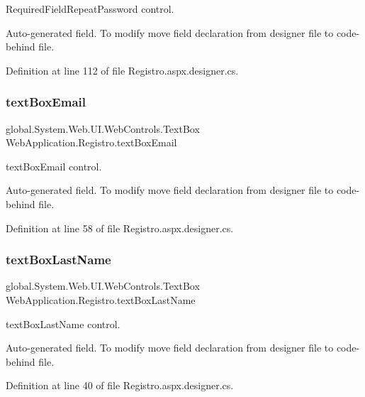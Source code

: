 Required\+Field\+Repeat\+Password control. 

Auto-\/generated field. To modify move field declaration from designer file to code-\/behind file. 

Definition at line 112 of file Registro.\+aspx.\+designer.\+cs.

\mbox{\label{classWebApplication_1_1Registro_a59faaf483b15d3083f8af6d61ff8c41e}} 
\subsubsection{\texorpdfstring{textBoxEmail}{textBoxEmail}}
{\footnotesize\ttfamily global.\+System.\+Web.\+U\+I.\+Web\+Controls.\+Text\+Box Web\+Application.\+Registro.\+text\+Box\+Email\hspace{0.3cm}{\ttfamily [protected]}}



text\+Box\+Email control. 

Auto-\/generated field. To modify move field declaration from designer file to code-\/behind file. 

Definition at line 58 of file Registro.\+aspx.\+designer.\+cs.

\mbox{\label{classWebApplication_1_1Registro_a8390d910d3bdf14b582533fc931f3cb7}} 
\subsubsection{\texorpdfstring{textBoxLastName}{textBoxLastName}}
{\footnotesize\ttfamily global.\+System.\+Web.\+U\+I.\+Web\+Controls.\+Text\+Box Web\+Application.\+Registro.\+text\+Box\+Last\+Name\hspace{0.3cm}{\ttfamily [protected]}}



text\+Box\+Last\+Name control. 

Auto-\/generated field. To modify move field declaration from designer file to code-\/behind file. 

Definition at line 40 of file Registro.\+aspx.\+designer.\+cs.

